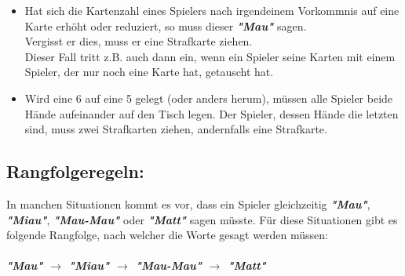 \documentclass{article}
\begin{document}
\begin{itemize}
         
\item Hat sich die Kartenzahl eines Spielers nach irgendeinem Vorkommnis auf eine Karte erhöht oder reduziert, so muss dieser \textit{\textbf{"Mau"}} sagen. \\ Vergisst er dies, muss er eine Strafkarte ziehen. \\ Dieser Fall tritt z.B. auch dann ein, wenn ein Spieler seine Karten mit einem Spieler, der nur noch eine Karte hat, getauscht hat.

\item Wird eine 6 auf eine 5 gelegt (oder anders herum), müssen alle Spieler beide Hände aufeinander auf den Tisch legen. Der Spieler, dessen Hände die letzten sind, muss zwei Strafkarten ziehen, andernfalls eine Strafkarte.

\end{itemize}

\subsection*{Rangfolgeregeln:}

In manchen Situationen kommt es vor, dass ein Spieler gleichzeitig \textit{\textbf{"Mau"}}, \textit{\textbf{"Miau"}}, \textit{\textbf{"Mau-Mau"}} oder \textit{\textbf{"Matt"}} sagen müsste. Für diese Situationen gibt es folgende Rangfolge, nach welcher die Worte gesagt werden müssen: \\ \\ \textit{\textbf{"Mau" $\rightarrow$ "Miau" $\rightarrow$ "Mau-Mau" $\rightarrow$ "Matt"}}
          
\end{document}
